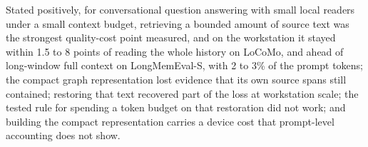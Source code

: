 Stated positively, for conversational question answering with small local readers under a small
context budget, retrieving a bounded amount of source text was the strongest quality-cost point
measured, and on the workstation it stayed within 1.5 to 8 points of reading the whole history on
LoCoMo, and ahead of long-window full context on LongMemEval-S, with 2 to 3\% of the prompt tokens; the compact graph representation lost evidence that its own source spans still contained;
restoring that text recovered part of the loss at workstation scale; the tested rule for spending a
token budget on that restoration did not work; and building the compact representation carries a
device cost that prompt-level accounting does not show.
